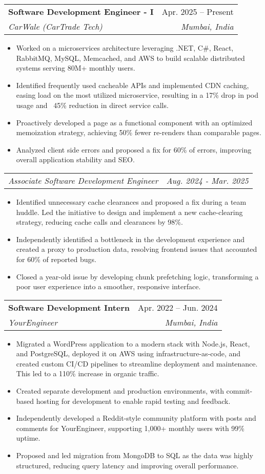 \documentclass[letterpaper,11pt]{article}
\makeatletter
\newcommand{\resumeItem}[1]{
  \item\small{
    {#1 \vspace{-2pt}}
  }
}
\newcommand{\resumeSubheading}[4]{
  \vspace{-2pt}\item
    \begin{tabular*}{0.97\textwidth}[t]{l@{\extracolsep{\fill}}r}
      \textbf{#1} & #2 \\
      \textit{\small#3} & \textit{\small #4} \\
    \end{tabular*}\vspace{-7pt}
}
\newcommand{\resumeSubSubheading}[2]{
    \item
    \begin{tabular*}{0.97\textwidth}{l@{\extracolsep{\fill}}r}
      \textit{\small#1} & \textit{\small #2} \\
    \end{tabular*}\vspace{-7pt}
}
\newcommand{\resumeItemListStart}{\begin{itemize}}
\newcommand{\resumeItemListEnd}{\end{itemize}\vspace{-5pt}}
\makeatother
\begin{document}
    \resumeSubheading
      {Software Development Engineer - I}{Apr. 2025 -- Present}
      {CarWale (CarTrade Tech)}{Mumbai, India}
      \resumeItemListStart
        \resumeItem{Worked on a microservices architecture leveraging .NET, C\#, React, RabbitMQ, MySQL, Memcached, and AWS to build scalable distributed systems serving 80M+ monthly users.}
        \resumeItem{Identified frequently used cacheable APIs and implemented CDN caching, easing load on the most utilized microservice, resulting in a 17\% drop in pod usage and ~45\% reduction in direct service calls.}
        \resumeItem{Proactively developed a page as a functional component with an optimized memoization strategy, achieving 50\% fewer re-renders than comparable pages.}
        \resumeItem{Analyzed client side errors and proposed a fix for 60\% of errors, improving overall application stability and SEO.}
      \resumeItemListEnd
   \resumeSubSubheading
    {Associate Software Development Engineer}{Aug. 2024 - Mar. 2025}
    \resumeItemListStart
       \resumeItem{Identified unnecessary cache clearances and proposed a fix during a team huddle. Led the initiative to design and implement a new cache-clearing strategy, reducing cache calls and clearances by 98\%.}
       \resumeItem{Independently identified a bottleneck in the development experience and created a proxy to production data, resolving frontend issues that accounted for 60\% of reported bugs.}
       \resumeItem{Closed a year-old issue by developing chunk prefetching logic, transforming a poor user experience into a smoother, responsive interface.}
    \resumeItemListEnd

    \resumeSubheading
      {Software Development Intern}{Apr. 2022 -- Jun. 2024}
      {YourEngineer}{Mumbai, India}
      \resumeItemListStart
        \resumeItem{Migrated a WordPress application to a modern stack with Node.js, React, and PostgreSQL, deployed it on AWS using infrastructure-as-code, and created custom CI/CD pipelines to streamline deployment and maintenance. This led to a 110\% increase in organic traffic.}
        \resumeItem{Created separate development and production environments, with commit-based hosting for development to enable rapid testing and feedback.}
        \resumeItem{Independently developed a Reddit-style community platform with posts and comments for YourEngineer, supporting 1,000+ monthly users with 99\% uptime.}
        \resumeItem{Proposed and led migration from MongoDB to SQL as the data was highly structured, reducing query latency and improving overall performance.}
    \resumeItemListEnd
\end{document}
